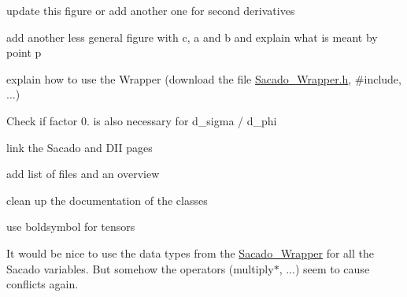 
\begin{DoxyRefList}
\item[\label{todo__todo000001}%
\hypertarget{todo__todo000001}{}%
page \hyperlink{index}{Trilinos\+:\+:Sacado example documentation} ]update this figure or add another one for second derivatives 

add another less general figure with c, a and b and explain what is meant by point p 

explain how to use the Wrapper (download the file \hyperlink{Sacado__Wrapper_8h}{Sacado\+\_\+\+Wrapper.\+h}, \#include, ...) 

Check if factor 0. is also necessary for d\+\_\+sigma / d\+\_\+phi

link the Sacado and D\+II pages

add list of files and an overview 

clean up the documentation of the classes

use boldsymbol for tensors

It would be nice to use the data types from the \hyperlink{namespaceSacado__Wrapper}{Sacado\+\_\+\+Wrapper} for all the Sacado variables. But somehow the operators (multiply$\ast$, ...) seem to cause conflicts again.
\end{DoxyRefList}